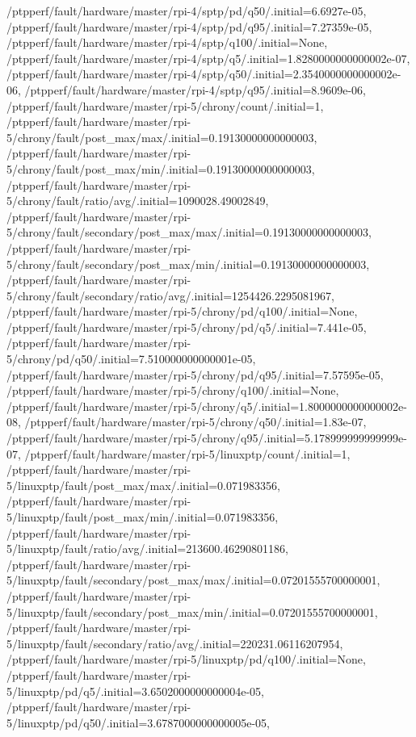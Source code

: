 {    /ptpperf/fault/hardware/master/rpi-4/sptp/pd/q50/.initial=6.6927e-05,
    /ptpperf/fault/hardware/master/rpi-4/sptp/pd/q95/.initial=7.27359e-05,
    /ptpperf/fault/hardware/master/rpi-4/sptp/q100/.initial=None,
    /ptpperf/fault/hardware/master/rpi-4/sptp/q5/.initial=1.8280000000000002e-07,
    /ptpperf/fault/hardware/master/rpi-4/sptp/q50/.initial=2.3540000000000002e-06,
    /ptpperf/fault/hardware/master/rpi-4/sptp/q95/.initial=8.9609e-06,
    /ptpperf/fault/hardware/master/rpi-5/chrony/count/.initial=1,
    /ptpperf/fault/hardware/master/rpi-5/chrony/fault/post_max/max/.initial=0.19130000000000003,
    /ptpperf/fault/hardware/master/rpi-5/chrony/fault/post_max/min/.initial=0.19130000000000003,
    /ptpperf/fault/hardware/master/rpi-5/chrony/fault/ratio/avg/.initial=1090028.49002849,
    /ptpperf/fault/hardware/master/rpi-5/chrony/fault/secondary/post_max/max/.initial=0.19130000000000003,
    /ptpperf/fault/hardware/master/rpi-5/chrony/fault/secondary/post_max/min/.initial=0.19130000000000003,
    /ptpperf/fault/hardware/master/rpi-5/chrony/fault/secondary/ratio/avg/.initial=1254426.2295081967,
    /ptpperf/fault/hardware/master/rpi-5/chrony/pd/q100/.initial=None,
    /ptpperf/fault/hardware/master/rpi-5/chrony/pd/q5/.initial=7.441e-05,
    /ptpperf/fault/hardware/master/rpi-5/chrony/pd/q50/.initial=7.510000000000001e-05,
    /ptpperf/fault/hardware/master/rpi-5/chrony/pd/q95/.initial=7.57595e-05,
    /ptpperf/fault/hardware/master/rpi-5/chrony/q100/.initial=None,
    /ptpperf/fault/hardware/master/rpi-5/chrony/q5/.initial=1.8000000000000002e-08,
    /ptpperf/fault/hardware/master/rpi-5/chrony/q50/.initial=1.83e-07,
    /ptpperf/fault/hardware/master/rpi-5/chrony/q95/.initial=5.178999999999999e-07,
    /ptpperf/fault/hardware/master/rpi-5/linuxptp/count/.initial=1,
    /ptpperf/fault/hardware/master/rpi-5/linuxptp/fault/post_max/max/.initial=0.071983356,
    /ptpperf/fault/hardware/master/rpi-5/linuxptp/fault/post_max/min/.initial=0.071983356,
    /ptpperf/fault/hardware/master/rpi-5/linuxptp/fault/ratio/avg/.initial=213600.46290801186,
    /ptpperf/fault/hardware/master/rpi-5/linuxptp/fault/secondary/post_max/max/.initial=0.07201555700000001,
    /ptpperf/fault/hardware/master/rpi-5/linuxptp/fault/secondary/post_max/min/.initial=0.07201555700000001,
    /ptpperf/fault/hardware/master/rpi-5/linuxptp/fault/secondary/ratio/avg/.initial=220231.06116207954,
    /ptpperf/fault/hardware/master/rpi-5/linuxptp/pd/q100/.initial=None,
    /ptpperf/fault/hardware/master/rpi-5/linuxptp/pd/q5/.initial=3.6502000000000004e-05,
    /ptpperf/fault/hardware/master/rpi-5/linuxptp/pd/q50/.initial=3.6787000000000005e-05,
}
